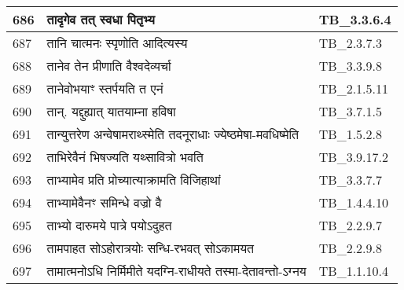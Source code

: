 \documentclass[17pt]{extarticle}
\begin{document}
\begin{longtable}{||p{0.4in}||p{4.9in}||p{0.9in}||}
    686 & तादृगेव तत् स्वधा पितृभ्य & TB\_3.3.6.4       \\
    
    \hline
        
    687 & तानि चात्मनः स्पृणोति आदित्यस्य & TB\_2.3.7.3       \\
    
    \hline
        
    688 & तानेव तेन प्रीणाति वैश्वदेव्यर्चा & TB\_3.3.9.8       \\
    
    \hline
        
    689 & तानेवोभयाꣳ स्तर्पयति त एनं & TB\_2.1.5.11       \\
    
    \hline
        
    690 & तान्. यद्दुह्यात् यातयाम्ना हविषा & TB\_3.7.1.5       \\
    
    \hline
        
    691 & तान्युत्तरेण अन्वेषामराथ्स्मेति तदनूराधाः ज्येष्ठमेषा{-}मवधिष्मेति & TB\_1.5.2.8       \\
    
    \hline
        
    692 & ताभिरेवैनं भिषज्यति यथ्सावित्रो भवति & TB\_3.9.17.2       \\
    
    \hline
        
    693 & ताभ्यामेव प्रति प्रोच्यात्याक्रामति विजिहाथां & TB\_3.3.7.7       \\
    
    \hline
        
    694 & ताभ्यामेवैनꣳ समिन्धे वज्रो वै & TB\_1.4.4.10       \\
    
    \hline
        
    695 & ताभ्यो दारुमये पात्रे पयोऽदुहत & TB\_2.2.9.7       \\
    
    \hline
        
    696 & तामपाहत सोऽहोरात्रयोः सन्धि{-}रभवत् सोऽकामयत & TB\_2.2.9.8       \\
    
    \hline
        
    697 & तामात्मनोऽधि निर्मिमीते यदग्नि{-}राधीयते तस्मा{-}देतावन्तो{-}ऽग्नय & TB\_1.1.10.4       \\
    
    \hline
        

\end{longtable}
\end{document}
